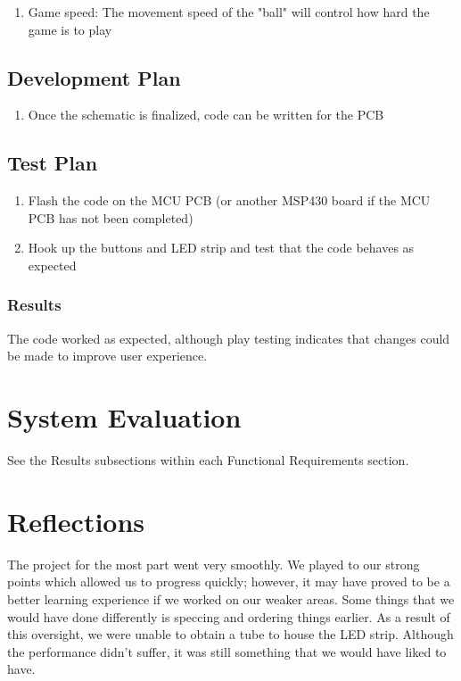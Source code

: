 \documentclass{notes}
\begin{document}
\begin{enumerate}
    \item Game speed: The movement speed of the "ball" will control how hard the game is to play
\end{enumerate}

\subsection{Development Plan}

\begin{enumerate}
    \item Once the schematic is finalized, code can be written for the PCB
\end{enumerate}

\subsection{Test Plan}

\begin{enumerate}
    \item Flash the code on the MCU PCB (or another MSP430 board if the MCU PCB has not been completed)
    \item Hook up the buttons and LED strip and test that the code behaves as expected
\end{enumerate}

\subsubsection{Results}

The code worked as expected, although play testing indicates that changes could be made to improve user experience.

\section{System Evaluation}

See the Results subsections within each Functional Requirements section.

\section{Reflections}

The project for the most part went very smoothly.
We played to our strong points which allowed us to progress quickly; however, it may have proved to be a better learning experience if we worked on our weaker areas.
Some things that we would have done differently is speccing and ordering things earlier.
As a result of this oversight, we were unable to obtain a tube to house the LED strip.
Although the performance didn't suffer, it was still something that we would have liked to have.
\end{document}
